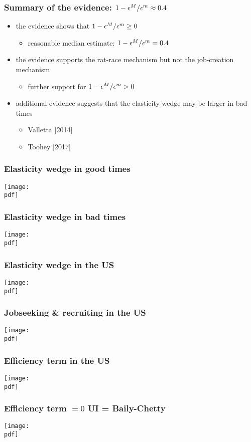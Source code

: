\documentclass[12pt,xcolor={dvipsnames},hyperref={pdftex,pdfpagemode=UseNone,hidelinks,pdfdisplaydoctitle=true},usepdftitle=false]{beamer}
\def\pdf{xui.pdf}
\begin{document}
\begin{frame}
\frametitle{Summary of the evidence: $1-\epsilon^{M}/\epsilon^{m}\approx 0.4$}
\begin{itemize}
\item the evidence shows that $1-\epsilon^{M}/\epsilon^{m} \geq 0$
\begin{itemize}
\item reasonable median estimate: $1-\epsilon^{M}/\epsilon^{m} = 0.4$
\end{itemize}
\item the evidence supports the rat-race mechanism but not the job-creation mechanism
\begin{itemize}
\item further support for $1-\epsilon^{M}/\epsilon^{m} > 0$
\end{itemize}
\item additional evidence suggests that the elasticity wedge may be larger in bad times
\begin{itemize}
\item Valletta [2014]    
\item Toohey [2017]
\end{itemize}
\end{itemize}
\end{frame}

\begin{frame}
\frametitle{Elasticity wedge in good times}
\texttt{[image: \\pdf]}%
\end{frame}

\begin{frame}
\frametitle{Elasticity wedge in bad times}
\texttt{[image: \\pdf]}%
\end{frame}

\begin{frame}
\frametitle{Elasticity wedge in the US}
\texttt{[image: \\pdf]}%
\end{frame}

\begin{frame}
\frametitle{Jobseeking \& recruiting in the US}
\texttt{[image: \\pdf]}%
\end{frame}

\begin{frame}
\frametitle{Efficiency term in the US}
\texttt{[image: \\pdf]}%
\end{frame}


\begin{frame}
\frametitle{Efficiency term $=0$ \so UI = Baily-Chetty}
\texttt{[image: \\pdf]}%
\end{frame}
\end{document}

